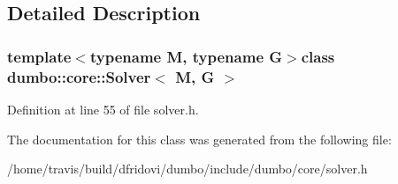 \subsection{Detailed Description}
\subsubsection*{template$<$typename M, typename G$>$class dumbo\-::core\-::\-Solver$<$ M, G $>$}



Definition at line 55 of file solver.\-h.



The documentation for this class was generated from the following file\-:\begin{DoxyCompactItemize}
\item 
/home/travis/build/dfridovi/dumbo/include/dumbo/core/solver.\-h\end{DoxyCompactItemize}
